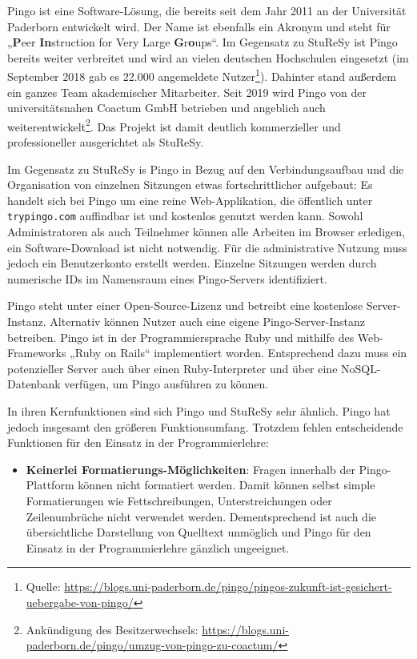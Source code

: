 Pingo ist eine Software-Lösung, die bereits seit dem Jahr 2011 an der Universität Paderborn entwickelt wird. Der Name ist ebenfalls ein Akronym und steht für „\textbf{P}eer \textbf{In}struction for Very Large \textbf{G}r\textbf{o}ups“. Im Gegensatz zu StuReSy ist Pingo bereits weiter verbreitet und wird an vielen deutschen Hochschulen eingesetzt (im September 2018 gab es 22.000 angemeldete Nutzer\footnote{Quelle:  \url{https://blogs.uni-paderborn.de/pingo/pingos-zukunft-ist-gesichert-uebergabe-von-pingo/}}). Dahinter stand außerdem ein ganzes Team akademischer Mitarbeiter. Seit 2019 wird Pingo von der universitätsnahen Coactum GmbH betrieben und angeblich auch weiterentwickelt\footnote{Ankündigung des Besitzerwechsels: \url{https://blogs.uni-paderborn.de/pingo/umzug-von-pingo-zu-coactum/}}. Das Projekt ist damit deutlich kommerzieller und professioneller ausgerichtet als StuReSy.

Im Gegensatz zu StuReSy is Pingo in Bezug auf den Verbindungsaufbau und die Organisation von einzelnen Sitzungen etwas fortschrittlicher aufgebaut: Es handelt sich bei Pingo um eine reine Web-Applikation, die öffentlich unter \texttt{trypingo.com} auffindbar ist und kostenlos genutzt werden kann. Sowohl Administratoren als auch Teilnehmer können alle Arbeiten im Browser erledigen, ein Software-Download ist nicht notwendig. Für die administrative Nutzung muss jedoch ein Benutzerkonto erstellt werden. Einzelne Sitzungen werden durch numerische IDs im Namensraum eines Pingo-Servers identifiziert.


Pingo steht unter einer Open-Source-Lizenz und betreibt eine kostenlose Server-Instanz. Alternativ können Nutzer auch eine eigene Pingo-Server-Instanz betreiben. Pingo ist in der Programmiersprache Ruby und mithilfe des Web-Frameworks „Ruby on Rails“ implementiert worden. Entsprechend dazu muss ein potenzieller Server auch über einen Ruby-Interpreter und über eine NoSQL-Datenbank verfügen, um Pingo ausführen zu können.

In ihren Kernfunktionen sind sich Pingo und StuReSy sehr ähnlich. Pingo hat jedoch insgesamt den größeren Funktionsumfang. Trotzdem fehlen entscheidende Funktionen für den Einsatz in der Programmierlehre:
\begin{itemize}
    \item \textbf{Keinerlei Formatierungs-Möglichkeiten}: Fragen innerhalb der Pingo-Plattform können nicht formatiert werden. Damit können selbst simple Formatierungen wie Fettschreibungen, Unterstreichungen oder Zeilenumbrüche nicht verwendet werden. Dementsprechend ist auch die übersichtliche Darstellung von Quelltext unmöglich und Pingo für den Einsatz in der Programmierlehre gänzlich ungeeignet.
\end{itemize}

